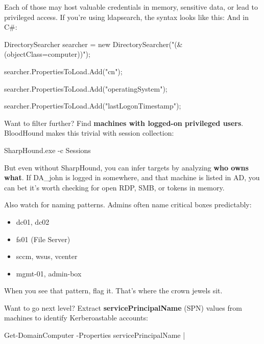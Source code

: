 Each of those may host valuable credentials in memory, sensitive data, or lead to privileged access.
If you’re using ldapsearch, the syntax looks like this:
And in C\#:

DirectorySearcher searcher = new DirectorySearcher("(\&(objectClass=computer))");

searcher.PropertiesToLoad.Add("cn");

searcher.PropertiesToLoad.Add("operatingSystem");

searcher.PropertiesToLoad.Add("lastLogonTimestamp");

Want to filter further? Find \textbf{machines with logged-on privileged users}. BloodHound makes this trivial with session collection:

SharpHound.exe -c Sessions

But even without SharpHound, you can infer targets by analyzing \textbf{who owns what}. If DA\_john is logged in somewhere, and that machine is listed in AD, you can bet it’s worth checking for open RDP, SMB, or tokens in memory.

Also watch for naming patterns. Admins often name critical boxes predictably:

\begin{itemize}
    \item dc01, dc02

    \item fs01 (File Server)

    \item sccm, wsus, vcenter

    \item mgmt-01, admin-box

\end{itemize}
When you see that pattern, flag it. That’s where the crown jewels sit.

Want to go next level? Extract \textbf{servicePrincipalName} (SPN) values from machines to identify Kerberoastable accounts:

Get-DomainComputer -Properties servicePrincipalName |


